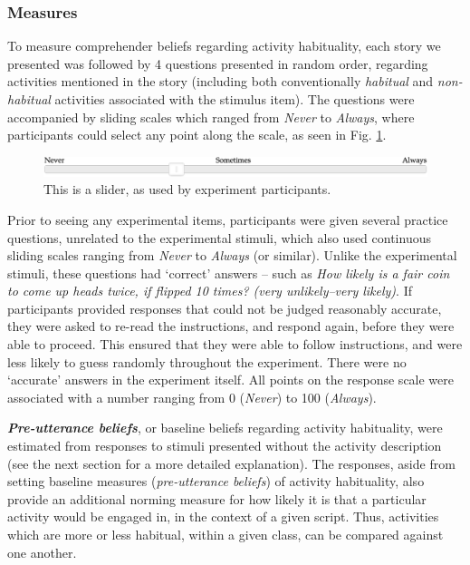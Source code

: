 \documentclass{sp}\usepackage[]{graphicx}\usepackage[]{color}
\begin{document}
\subsubsection{Measures}

To measure comprehender beliefs regarding activity habituality, each story we presented was followed by 4 questions presented in random order, regarding activities mentioned in the story (including both conventionally \textit{habitual} and \textit{non-habitual} activities associated with the stimulus item). The questions were accompanied by sliding scales which ranged from \textit{Never} to \textit{Always}, where participants could select any point along the scale, as seen in Fig. \ref{fig:slider}.

\begin{figure}
\centering
\includegraphics[width=\textwidth]{slider.png}
\caption{\label{fig:slider} This is a slider, as used by experiment participants.}
\end{figure}

Prior to seeing any experimental items, participants were given several practice questions, unrelated to the experimental stimuli, which also used continuous sliding scales ranging from \textit{Never} to \textit{Always} (or similar). Unlike the experimental stimuli, these questions had `correct' answers -- such as \textit{How likely is a fair coin to come up heads twice, if flipped 10 times? (very unlikely--very likely)}. If participants provided responses that could not be judged reasonably accurate, they were asked to re-read the instructions, and respond again, before they were able to proceed. This ensured that they were able to follow instructions, and were less likely to guess randomly throughout the experiment. There were no `accurate' answers in the experiment itself. All points on the response scale were associated with a number ranging from 0 (\textit{Never}) to 100 (\textit{Always}). 

\textbf{\textit{Pre-utterance beliefs}}, or baseline beliefs regarding activity habituality, were estimated from responses to stimuli presented without the activity description (see the next section for a more detailed explanation). The responses, aside from setting baseline measures (\textit{pre-utterance beliefs}) of activity habituality, also provide an additional norming measure for how likely it is that a particular activity would be engaged in, in the context of a given script. Thus, activities which are more or less habitual, within a given class, can be compared against one another.
\end{document}
